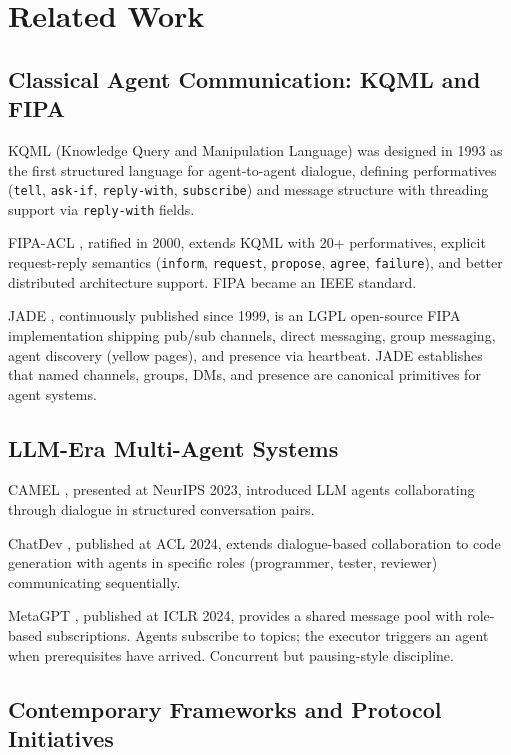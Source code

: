 \documentclass[11pt]{article}
\begin{document}
\section{Related Work}

\subsection{Classical Agent Communication: KQML and FIPA}

KQML (Knowledge Query and Manipulation Language) \cite{kqml1993} was designed in 1993 as the first structured language for agent-to-agent dialogue, defining performatives (\texttt{tell}, \texttt{ask-if}, \texttt{reply-with}, \texttt{subscribe}) and message structure with threading support via \texttt{reply-with} fields.

FIPA-ACL \cite{fipa2000}, ratified in 2000, extends KQML with 20+ performatives, explicit request-reply semantics (\texttt{inform}, \texttt{request}, \texttt{propose}, \texttt{agree}, \texttt{failure}), and better distributed architecture support. FIPA became an IEEE standard.

JADE \cite{jade1999}, continuously published since 1999, is an LGPL open-source FIPA implementation shipping pub/sub channels, direct messaging, group messaging, agent discovery (yellow pages), and presence via heartbeat. JADE establishes that named channels, groups, DMs, and presence are canonical primitives for agent systems.

\subsection{LLM-Era Multi-Agent Systems}

CAMEL \cite{camel2023}, presented at NeurIPS 2023, introduced LLM agents collaborating through dialogue in structured conversation pairs.

ChatDev \cite{chatdev2024}, published at ACL 2024, extends dialogue-based collaboration to code generation with agents in specific roles (programmer, tester, reviewer) communicating sequentially.

MetaGPT \cite{metagpt2024}, published at ICLR 2024, provides a shared message pool with role-based subscriptions. Agents subscribe to topics; the executor triggers an agent when prerequisites have arrived. Concurrent but pausing-style discipline.

\subsection{Contemporary Frameworks and Protocol Initiatives}
\end{document}
